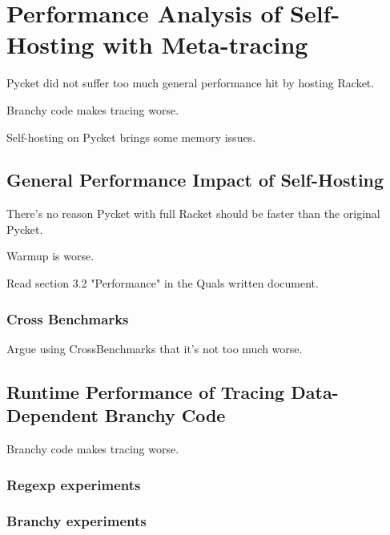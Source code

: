 \chapter{Performance Analysis of Self-Hosting with Meta-tracing}

	\begin{chapterpoint}
		Pycket did not suffer too much general performance hit by hosting Racket.

		Branchy code makes tracing worse.

		Self-hosting on Pycket brings some memory issues.
	\end{chapterpoint}

	\section{General Performance Impact of Self-Hosting}

		\begin{mainpoint}
			There's no reason Pycket with full Racket should be faster than the original Pycket.

			Warmup is worse.
		\end{mainpoint}

		\begin{todo}[Import]
				Read section 3.2 "Performance" in the Quals written document.
		\end{todo}

		\subsection{Cross Benchmarks}

			\begin{mainpoint}
				Argue using CrossBenchmarks that it's not too much worse.
			\end{mainpoint}

	\section{Runtime Performance of Tracing Data-Dependent Branchy Code}
		\begin{mainpoint}
			Branchy code makes tracing worse.
		\end{mainpoint}

		\subsection{Regexp experiments}
		\subsection{Branchy experiments}


